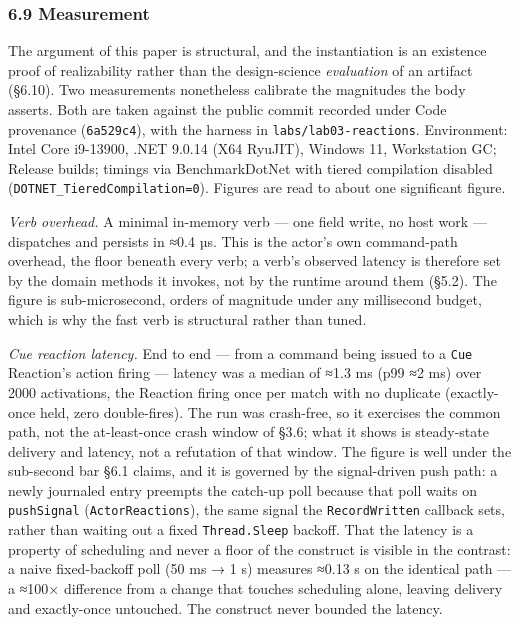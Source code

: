 \documentclass[
]{article}
\newcounter{none} %
\let\origtexttt\texttt%
\renewcommand{\texttt}[1]{\origtexttt{\seqsplit{#1}}}%
\let\texttt\origtexttt%
\begin{document}
\subsubsection{6.9 Measurement}\label{measurement}

The argument of this paper is structural, and the instantiation is an
existence proof of realizability rather than the design-science
\emph{evaluation} of an artifact (§6.10). Two measurements nonetheless
calibrate the magnitudes the body asserts. Both are taken against the
public commit recorded under Code provenance (\texttt{6a529c4}), with
the harness in \texttt{labs/lab03-reactions}. Environment: Intel Core
i9-13900, .NET 9.0.14 (X64 RyuJIT), Windows 11, Workstation GC; Release
builds; timings via BenchmarkDotNet with tiered compilation disabled
(\texttt{DOTNET\_TieredCompilation=0}). Figures are read to about one
significant figure.

\emph{Verb overhead.} A minimal in-memory verb --- one field write, no
host work --- dispatches and persists in ≈0.4 µs. This is the actor's
own command-path overhead, the floor beneath every verb; a verb's
observed latency is therefore set by the domain methods it invokes, not
by the runtime around them (§5.2). The figure is sub-microsecond, orders
of magnitude under any millisecond budget, which is why the fast verb is
structural rather than tuned.

\emph{Cue reaction latency.} End to end --- from a command being issued
to a \texttt{Cue} Reaction's action firing --- latency was a median of
≈1.3 ms (p99 ≈2 ms) over 2000 activations, the Reaction firing once per
match with no duplicate (exactly-once held, zero double-fires). The run
was crash-free, so it exercises the common path, not the at-least-once
crash window of §3.6; what it shows is steady-state delivery and
latency, not a refutation of that window. The figure is well under the
sub-second bar §6.1 claims, and it is governed by the signal-driven push
path: a newly journaled entry preempts the catch-up poll because that
poll waits on \texttt{pushSignal} (\texttt{ActorReactions}), the same
signal the \texttt{RecordWritten} callback sets, rather than waiting out
a fixed \texttt{Thread.Sleep} backoff. That the latency is a property of
scheduling and never a floor of the construct is visible in the
contrast: a naive fixed-backoff poll (50 ms → 1 s) measures ≈0.13 s on
the identical path --- a ≈100× difference from a change that touches
scheduling alone, leaving delivery and exactly-once untouched. The
construct never bounded the latency.
\end{document}
